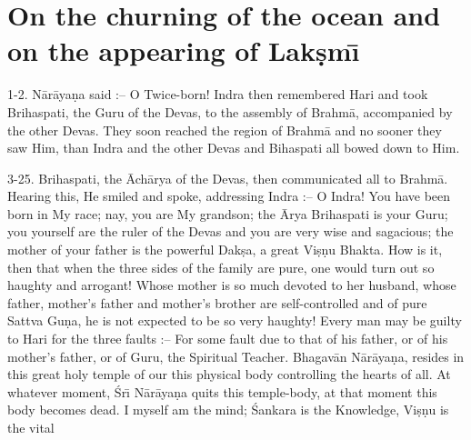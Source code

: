 \chapter{On the churning of the ocean and on the appearing of Lak\d{s}m\={\i}}

1-2. N\=ar\=aya\d{n}a said :-- O Twice-born! Indra then remembered Hari and took Brihaspati, the Guru of the Devas, to the assembly of Brahm\=a, accompanied by the other Devas. They soon reached the region of Brahm\=a and no sooner they saw Him, than Indra and the other Devas and Bihaspati all bowed down to Him.

3-25. Brihaspati, the \=Ach\=arya of the Devas, then communicated all to Brahm\=a. Hearing this, He smiled and spoke, addressing Indra :-- O Indra! You have been born in My race; nay, you are My grandson; the \=Arya Brihaspati is your Guru; you yourself are the ruler of the Devas and you are very wise and sagacious; the mother of your father is the powerful Dak\d{s}a, a great Vi\d{s}\d{n}u Bhakta. How is it, then that when the three sides of the family are pure, one would turn out so haughty and arrogant! Whose mother is so much devoted to her husband, whose father, mother's father and mother's brother are self-controlled and of pure Sattva Gu\d{n}a, he is not expected to be so very haughty! Every man may be guilty to Hari for the three faults :-- For some fault due to that of his father, or of his mother's father, or of Guru, the Spiritual Teacher. Bhagav\=an N\=ar\=aya\d{n}a, resides in this great holy temple of our this physical body controlling the hearts of all. At whatever moment, \'Sr\={\i} N\=ar\=aya\d{n}a quits this temple-body, at that moment this body becomes dead. I myself am the mind; \'Sankara is the Knowledge, Vi\d{s}\d{n}u is the vital

